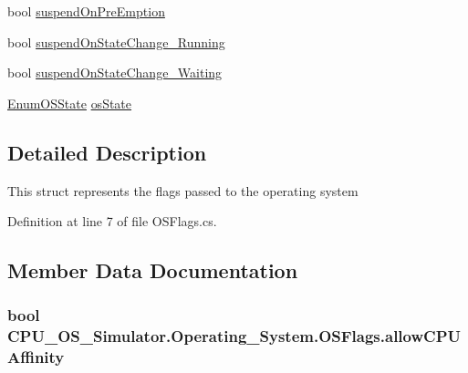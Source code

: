 \begin{DoxyCompactItemize}
\item 
bool \hyperlink{struct_c_p_u___o_s___simulator_1_1_operating___system_1_1_o_s_flags_a78836e63be936381215978ac392e1e60}{suspend\+On\+Pre\+Emption}
\item 
bool \hyperlink{struct_c_p_u___o_s___simulator_1_1_operating___system_1_1_o_s_flags_a828cad0b61448732b96162511e18352f}{suspend\+On\+State\+Change\+\_\+\+Running}
\item 
bool \hyperlink{struct_c_p_u___o_s___simulator_1_1_operating___system_1_1_o_s_flags_ac3439768b6e151e974a26a35ab0452a2}{suspend\+On\+State\+Change\+\_\+\+Waiting}
\item 
\hyperlink{namespace_c_p_u___o_s___simulator_1_1_operating___system_a03a98a403abc737c106a8f92db5bffc1}{Enum\+O\+S\+State} \hyperlink{struct_c_p_u___o_s___simulator_1_1_operating___system_1_1_o_s_flags_a7337260d7d298a9a195322b2bddb2102}{os\+State}
\end{DoxyCompactItemize}


\subsection{Detailed Description}
This struct represents the flags passed to the operating system 



Definition at line 7 of file O\+S\+Flags.\+cs.



\subsection{Member Data Documentation}
\hypertarget{struct_c_p_u___o_s___simulator_1_1_operating___system_1_1_o_s_flags_ac1d1812ad9ef56ccadacb19831d2e92d}{}
\subsubsection[{allow\+C\+P\+U\+Affinity}]{\setlength{\rightskip}{0pt plus 5cm}bool C\+P\+U\+\_\+\+O\+S\+\_\+\+Simulator.\+Operating\+\_\+\+System.\+O\+S\+Flags.\+allow\+C\+P\+U\+Affinity}\label{struct_c_p_u___o_s___simulator_1_1_operating___system_1_1_o_s_flags_ac1d1812ad9ef56ccadacb19831d2e92d}


